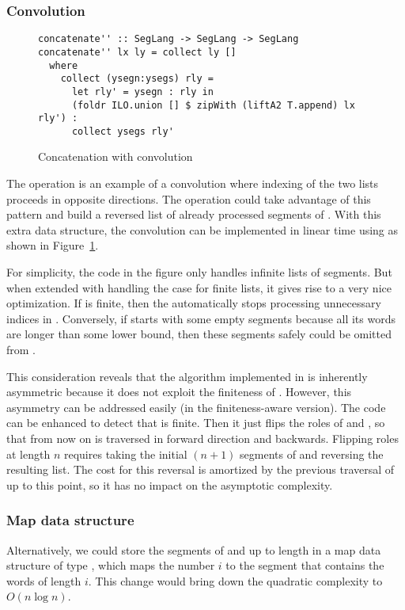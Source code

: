 \subsubsection{Convolution}
\begin{figure}[tp]
\begin{lstlisting}
concatenate'' :: SegLang -> SegLang -> SegLang
concatenate'' lx ly = collect ly []
  where
    collect (ysegn:ysegs) rly =
      let rly' = ysegn : rly in
      (foldr ILO.union [] $ zipWith (liftA2 T.append) lx rly') :
      collect ysegs rly'
\end{lstlisting}
  \caption{Concatenation with convolution}
  \label{fig:concatenation-with-convolution}
\end{figure}
The  operation is an example of a convolution where
indexing of the two lists proceeds in opposite directions. The  operation
could take advantage of this pattern and build a reversed list  of already
processed segments of . With this extra data structure, the
convolution can be implemented in linear time using
 as shown in Figure~\ref{fig:concatenation-with-convolution}.

For simplicity, the code in the figure only handles infinite lists of
segments. But when extended with handling the case for finite lists,
it gives rise to a very nice optimization. If  is finite,
then the  automatically stops processing unnecessary indices in
. Conversely, if  starts with some empty segments
because all its words are longer than some lower bound, then these
segments safely could be omitted from .

This consideration reveals that the algorithm implemented in
 is inherently asymmetric because it does not
exploit the finiteness of . However, this asymmetry can be
addressed easily (in the finiteness-aware version).  The code can be
enhanced to detect that  is finite. Then it just flips the roles of
 and , so that from now on  is traversed in 
forward direction and  backwards. Flipping roles at length $n$ requires taking
the initial $(n+1)$ segments of  and reversing the resulting
list. The cost for this reversal is amortized by the previous traversal of
 up to this point, so it has no impact on the asymptotic complexity.

\subsubsection{Map data structure}
Alternatively, we could store the segments of  and 
up to length  in a map data structure of type
, which maps the number $i$ to the
segment that contains the words of length $i$. This change would bring
down the quadratic complexity to $O (n\log n)$. 

